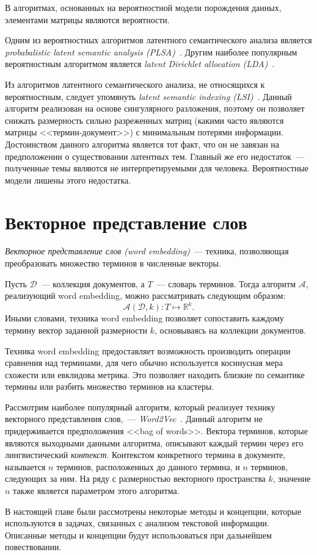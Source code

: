 В алгоритмах, основанных на вероятностной модели порождения
данных, элементами матрицы являются вероятности.

Одним из вероятностных алгоритмов латентного семантического анализа
является \textit{probabalistic latent semantic analysis 
(PLSA)}~\cite{chemudugunta2007modeling}. Другим наиболее
популярным вероятностным алгоритмом является \textit{latent
Dirichlet allocation (LDA)}~\cite{blei2003latent}.

Из алгоритмов латентного семантического анализа, не относящихся
к вероятностным, следует упомянуть 
\textit{latent semantic indexing (LSI)}~\cite{deerwester1990indexing}.
Данный алгоритм реализован на основе сингулярного разложения,
поэтому он позволяет снижать размерность сильно разреженных
матриц (какими часто являются матрицы <<термин-документ>>) с
минимальным потерями информации. Достоинством данного алгоритма
является тот факт, что он не завязан на предположении о
существовании латентных тем. Главный же его недостаток~--- 
полученные темы являются не интерпретируемыми для человека.
Вероятностные модели лишены этого недостатка.

\section{Векторное представление слов}
\label{sec:word_embedding}
\textit{Векторное представление слов (word embedding)}~---
техника, позволяющая преобразовать множество терминов в
численные векторы.

Пусть $\mathcal{D}$~--- коллекция документов, а
$T$~--- словарь терминов. Тогда алгоритм $\mathcal{A}$,
реализующий word embedding, можно рассматривать следующим образом:
\[
    \mathcal{A}(\mathcal{D}, k) \colon T \mapsto \mathbb{R}^k.
\]
Иными словами, техника word embedding позволяет сопоставить
каждому термину вектор заданной размерности $k$, основываясь
на коллекции документов.

Техника word embedding предоставляет возможность производить
операции сравнения над терминами, для чего обычно используется
косинусная мера схожести или евклидова метрика. Это позволяет
находить близкие по семантике термины или разбить множество
терминов на кластеры.

Рассмотрим наиболее популярный алгоритм, который реализует
технику векторного представления слов,~--- 
\textit{Word2Vec}~\cite{goldberg2014word2vec}. Данный
алгоритм не придерживается предположения <<bag of words>>.
Вектора терминов, которые являются выходными данными алгоритма,
описывают каждый термин через его лингвистический \textit{контекст}.
Контекстом конкретного термина в документе, называется $n$ терминов,
расположенных до данного термина, и $n$ терминов, следующих за ним.
На ряду с размерностью векторного пространства $k$, значение $n$
также является параметром этого алгоритма.

\chapterconclusion

В настоящей главе были рассмотрены некоторые методы и концепции,
которые используются в задачах, связанных с анализом текстовой
информации. Описанные методы и концепции будут использоваться
при дальнейшем повествовании.
